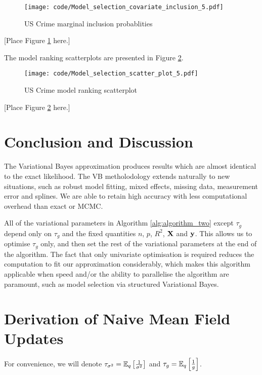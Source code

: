 \documentclass{amsart}[12pt]
\begin{document}
\begin{figure}[p]
	\texttt{[image: code/Model\_selection\_covariate\_inclusion\_5.pdf]}
	\caption{US Crime marginal inclusion probablities}
	\label{fig:USCrime_inclusion}
\end{figure}

[Place Figure \ref{fig:USCrime_inclusion} here.]

The model ranking scatterplots are presented in Figure \ref{fig:USCrime_model_ranking}.

\begin{figure}[p]
	\texttt{[image: code/Model\_selection\_scatter\_plot\_5.pdf]}
	\caption{US Crime model ranking scatterplot}
	\label{fig:USCrime_model_ranking}
\end{figure}

[Place Figure \ref{fig:USCrime_model_ranking} here.]

\section{Conclusion and Discussion}
\label{sec:conclusion}

The Variational Bayes approximation produces results which are almost identical to the exact likelihood.
The VB metholodology extends naturally to new situations, such as robust model fitting, mixed effects, missing
data, measurement error and splines. We are able to retain high accuracy with less computational overhead than
exact or MCMC.

All of the variational parameters in Algorithm \ref{alg:algorithm_two} except $\tau_g$ depend only on $\tau_g$
and the fixed quantities $n$, $p$, $R^2$, ${\bf X}$ and ${\bf y}$. This allows us to optimise $\tau_g$ only, and then
set the rest of the variational parameters at the end of the algorithm. The fact that only univariate
optimisation is required reduces the computation to fit our approximation considerably, which makes this
algorithm applicable when speed and/or the ability to parallelise the algorithm are paramount, such as model
selection via structured Variational Bayes.




\appendix
\section{Derivation of Naive Mean Field Updates}
\label{sec:appendix}
For convenience, we will denote $\tau_{\sigma^2} = \mathbb{E}_q \left[ \frac{1}{\sigma^2} \right]$ and $\tau_{g} =
\mathbb{E}_q \left[ \frac{1}{g} \right]$.
\end{document}
